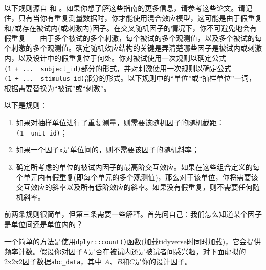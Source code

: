 \documentclass[
]{book}
\providecommand{\tightlist}{%
  \setlength{\itemsep}{0pt}\setlength{\parskip}{0pt}}
\begin{document}
以下规则源自 \citet{Barr_et_al_2013} 和 \citet{Barr_2013} 。如果你想了解这些指南的更多信息，请参考这些论文。请记住，只有当你有重复测量数据时，你才能使用混合效应模型，这可能是由于假重复和/或存在被试内(或刺激内)因子。在交叉随机因子的情况下，你不可避免地会有假重复------由于多个被试的多个刺激，每个被试的多个观测值，以及多个被试的每个刺激的多个观测值。确定随机效应结构的关键是弄清楚哪些因子是被试内或刺激内，以及设计中的假重复位于何处。你对被试使用一次规则以确定公式\texttt{(1\ +\ ...\ \textbar{}\ subject\_id)}部分的形式，并对刺激使用一次规则以确定公式\texttt{(1\ +\ ...\ \textbar{}\ stimulus\_id)}部分的形式。以下规则中的``单位''或``抽样单位''一词，根据需要替换为``被试''或``刺激''。

以下是规则：

\begin{enumerate}
\def\labelenumi{\arabic{enumi}.}
\tightlist
\item
  如果对抽样单位进行了重复测量，则需要该随机因子的随机截距：\texttt{(1\ \textbar{}\ unit\_id)}；
\item
  如果一个因子\texttt{x}是单位间的，则不需要该因子的随机斜率；
\item
  确定所考虑的单位的被试内因子的最高阶交互效应。如果在这些组合定义的每个单元内有假重复(即每个单元的多个观测值)，那么对于该单位，你将需要该交互效应的斜率以及所有低阶效应的斜率。如果没有假重复，则不需要任何随机斜率。
\end{enumerate}

前两条规则很简单，但第三条需要一些解释。首先问自己：我们怎么知道某个因子是单位间还是单位内的？

一个简单的方法是使用\texttt{dplyr::count()}函数(加载tidyverse时同时加载)，它会提供频率计数。假设你对因子A是否在被试内还是被试者间感兴趣，对下面虚拟的2x2x2因子数据\texttt{abc\_data}，其中 \(A\)、\(B\)和\(C\)是你的设计因子。
\end{document}
